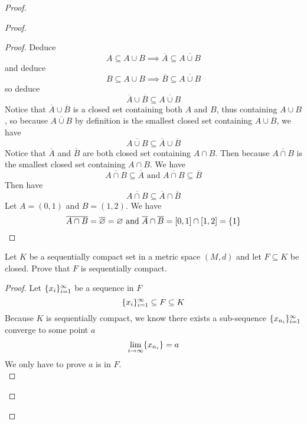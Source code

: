 \documentclass{report}
\begin{document}
\begin{proof}
\begin{proof}
\begin{proof}
Deduce
\begin{equation}
A\subseteq A\cup B\implies \overline{A}\subseteq \overline{A\cup B}
\end{equation}
and deduce
\begin{equation}
B\subseteq A\cup B\implies \overline{B}\subseteq \overline{A\cup B}
\end{equation}
so deduce
\begin{equation}
\overline{A}\cup \overline{B}\subseteq \overline{A\cup B}
\end{equation}
Notice that $\overline{A}\cup \overline{B}$ is a closed set containing both $A$ and  $B$, thus containing $A\cup B$, so because $\overline{A\cup B}$ by definition is the smallest closed set containing $A\cup B$, we have
\begin{equation}
\overline{A\cup B}\subseteq \overline{A}\cup \overline{B}
\end{equation}
Notice that $\overline{A}$ and $\overline{B}$ are both closed set containing $A\cap B$. Then because $\overline{A\cap B}$ is the smallest closed set containing  $A\cap B$. We have
\begin{equation}
\overline{A\cap B}\subseteq \overline{A}\text{ and }\overline{A\cap B}\subseteq \overline{B}
\end{equation}
Then have
\begin{equation}
\overline{A\cap B}\subseteq \overline{A}\cap \overline{B}
\end{equation}
Let $A=(0,1)$ and $B=(1,2)$. We have
\begin{equation}
\overline{A\cap B}=\overline{\varnothing}=\varnothing\text{ and }\overline{A}\cap \overline{B}=[0,1]\cap [1,2]=\{ 1 \}
\end{equation}
\end{proof}
\begin{question}{}{}

Let \( K \) be a sequentially compact set in a metric space \( (M, d) \) and let \( F \subseteq K \) be closed. Prove that \( F \) is sequentially compact.
\end{question}
\begin{proof}
Let $\{ x_i \}_{i=1}^\infty$ be a sequence in $F$
\begin{equation}
  \{ x_i \}_{i=1}^\infty \subseteq F\subseteq K
\end{equation}
Because $K$ is sequentially compact, we know there exists a sub-sequence $\{ x_{n_i} \}_{i=1}^\infty$ converge to some point $a$
 \begin{equation}
\lim_{i\to\infty}\{ x_{n_i} \}=a
\end{equation}
We only have to prove  $a$ is in  $F$.\\


\end{proof}
\end{proof}
\end{proof}
\end{document}
